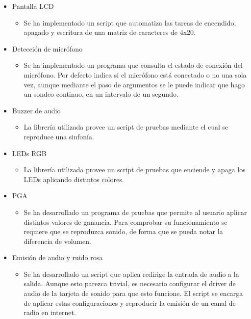 \begin{itemize}

	\item Pantalla \acrshort{LCD}
	\begin{itemize}
		\item Se ha implementado un script que automatiza las tareas de encendido, apagado y escritura de una matriz de caracteres de 4x20.
	\end{itemize}

	\item Detección de micrófono
	\begin{itemize}
		\item Se ha implementado un programa que consulta el estado de conexión del micrófono. Por defecto indica si el micrófono está conectado o no una sola vez, aunque mediante el paso de argumentos se le puede indicar que hago un sondeo continuo, en un intervalo de un segundo.
	\end{itemize}

	\item Buzzer de audio
	\begin{itemize}
		\item La librería utilizada provee un script de pruebas mediante el cual se reproduce una sinfonía.
	\end{itemize}

	\item \acrshort{LED}s RGB
	\begin{itemize}
		\item La librería utilizada provee un script de pruebas que enciende y apaga los \acrshort{LED}s aplicando distintos colores.
	\end{itemize}

	\item \acrshort{PGA}
	\begin{itemize}
		\item Se ha desarrollado un programa de pruebas que permite al usuario aplicar distintos valores de ganancia. Para comprobar su funcionamiento se requiere que se reproduzca sonido, de forma que se pueda notar la diferencia de volumen.
	\end{itemize}

	\item Emisión de audio y ruido rosa
	\begin{itemize}
		\item Se ha desarrollado un script que aplica redirige la entrada de audio a la salida. Aunque esto parezca trivial, es necesario configurar el driver de audio de la tarjeta de sonido para que esto funcione. El script se encarga de aplicar estas configuraciones y reproducir la emisión de un canal de radio en internet.


\end{itemize}
\end{itemize}
